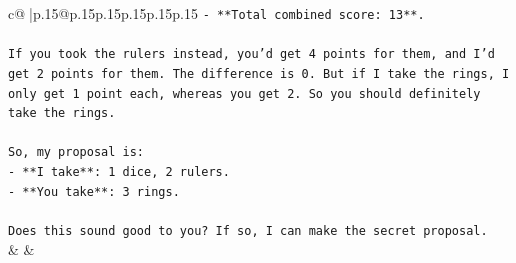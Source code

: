 \documentclass{article}
\begin{document}
{\begin{supertabular}{c@{$\;$}|p{.15\linewidth}@{}p{.15\linewidth}p{.15\linewidth}p{.15\linewidth}p{.15\linewidth}p{.15\linewidth}}
{{{\texttt{{-} **Total combined score: 13**.} \\
\\ 
\texttt{If you took the rulers instead, you'd get 4 points for them, and I'd get 2 points for them. The difference is 0. But if I take the rings, I only get 1 point each, whereas you get 2. So you should definitely take the rings.} \\
\\ 
\texttt{So, my proposal is:} \\
\texttt{{-} **I take**: 1 dice, 2 rulers.} \\
\texttt{{-} **You take**: 3 rings.} \\
\\ 
\texttt{Does this sound good to you? If so, I can make the secret proposal.} \\
            }
        }
    }
    & & \\ \\


\end{supertabular}}
\end{document}
